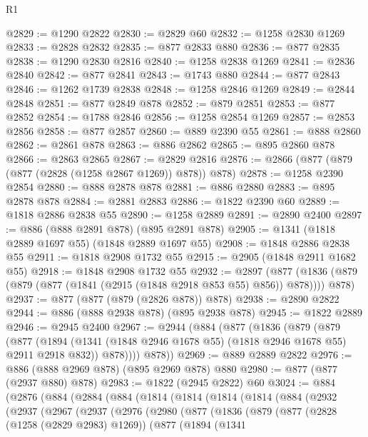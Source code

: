 \begin{lexlean}{R1}
\begin{coremodule}
@2829 := @1290 @2822
@2830 := @2829 @60
@2832 := @1258 @2830 @1269
@2833 := @2828 @2832
@2835 := @877 @2833 @880
@2836 := @877 @2835
@2838 := @1290 @2830 @2816
@2840 := @1258 @2838 @1269
@2841 := @2836 @2840
@2842 := @877 @2841
@2843 := @1743 @880
@2844 := @877 @2843
@2846 := @1262 @1739 @2838
@2848 := @1258 @2846 @1269
@2849 := @2844 @2848
@2851 := @877 @2849 @878
@2852 := @879 @2851
@2853 := @877 @2852
@2854 := @1788 @2846
@2856 := @1258 @2854 @1269
@2857 := @2853 @2856
@2858 := @877 @2857
@2860 := @889 @2390 @55
@2861 := @888 @2860
@2862 := @2861 @878
@2863 := @886 @2862
@2865 := @895 @2860 @878
@2866 := @2863 @2865
@2867 := @2829 @2816
@2876 := @2866 (@877 (@879 (@877 (@2828 (@1258 @2867 @1269)) @878)) @878)
@2878 := @1258 @2390 @2854
@2880 := @888 @2878 @878
@2881 := @886 @2880
@2883 := @895 @2878 @878
@2884 := @2881 @2883
@2886 := @1822 @2390 @60
@2889 := @1818 @2886 @2838 @55
@2890 := @1258 @2889
@2891 := @2890 @2400
@2897 := @886 (@888 @2891 @878) (@895 @2891 @878)
@2905 := @1341 (@1818 @2889 @1697 @55) (@1848 @2889 @1697 @55)
@2908 := @1848 @2886 @2838 @55
@2911 := @1818 @2908 @1732 @55
@2915 := @2905 (@1848 @2911 @1682 @55)
@2918 := @1848 @2908 @1732 @55
@2932 := @2897
    (@877 (@1836 (@879 (@879 (@877 (@1841 (@2915 (@1848 @2918 @853 @55) @856)) @878)))) @878)
@2937 := @877 (@877 (@879 (@2826 @878)) @878)
@2938 := @2890 @2822
@2944 := @886 (@888 @2938 @878) (@895 @2938 @878)
@2945 := @1822 @2889
@2946 := @2945 @2400
@2967 := @2944
    (@884
      (@877
        (@1836
          (@879
            (@879
              (@877
                (@1894 (@1341 (@1848 @2946 @1678 @55) (@1818 @2946 @1678 @55) @2911 @2918 @832))
                @878))))
        @878))
@2969 := @889 @2889 @2822
@2976 := @886 (@888 @2969 @878) (@895 @2969 @878) @880
@2980 := @877 (@877 (@2937 @880) @878)
@2983 := @1822 (@2945 @2822) @60
@3024 := @884
    (@2876
      (@884
        (@2884
          (@884
            (@1814
              (@1814
                (@1814
                  (@1814
                    (@884
                      (@2932
                        (@2937
                          (@2967
                            (@2937
                              (@2976
                                (@2980
                                  (@877
                                    (@1836
                                      (@879
                                        (@877
                                          (@2828 (@1258 (@2829 @2983) @1269))
                                          (@877
                                            (@1894
                                              (@1341

\end{coremodule}
\end{lexlean}

